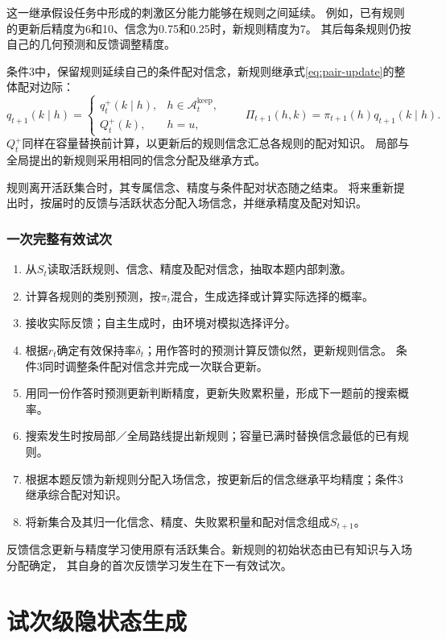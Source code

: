 \documentclass[11pt,a4paper]{article}
\numberwithin{equation}{section}
\newcommand{\A}{\mathcal{A}}
\begin{document}
这一继承假设任务中形成的刺激区分能力能够在规则之间延续。
例如，已有规则的更新后精度为6和10、信念为0.75和0.25时，新规则精度为7。
其后每条规则仍按自己的几何预测和反馈调整精度。

条件3中，保留规则延续自己的条件配对信念，新规则继承式\eqref{eq:pair-update}的整体配对边际：
\begin{equation}
q_{t+1}(k\mid h)=\begin{cases}q_t^+(k\mid h),&h\in\A_t^{\mathrm{keep}},\\
Q_t^+(k),&h=u,\end{cases}\qquad
\Pi_{t+1}(h,k)=\pi_{t+1}(h)q_{t+1}(k\mid h).
\label{eq:pair-transfer}
\end{equation}
$Q_t^+$同样在容量替换前计算，以更新后的规则信念汇总各规则的配对知识。
局部与全局提出的新规则采用相同的信念分配及继承方式。

规则离开活跃集合时，其专属信念、精度与条件配对状态随之结束。
将来重新提出时，按届时的反馈与活跃状态分配入场信念，并继承精度及配对知识。

\subsubsection{一次完整有效试次}
\begin{enumerate}
\item 从$S_t$读取活跃规则、信念、精度及配对信念，抽取本题内部刺激。
\item 计算各规则的类别预测，按$\pi_t$混合，生成选择或计算实际选择的概率。
\item 接收实际反馈；自主生成时，由环境对模拟选择评分。
\item 根据$r_t$确定有效保持率$\delta_t$；用作答时的预测计算反馈似然，更新规则信念。
条件3同时调整条件配对信念并完成一次联合更新。
\item 用同一份作答时预测更新判断精度，更新失败累积量，形成下一题前的搜索概率。
\item 搜索发生时按局部／全局路线提出新规则；容量已满时替换信念最低的已有规则。
\item 根据本题反馈为新规则分配入场信念，按更新后的信念继承平均精度；条件3继承综合配对知识。
\item 将新集合及其归一化信念、精度、失败累积量和配对信念组成$S_{t+1}$。
\end{enumerate}
反馈信念更新与精度学习使用原有活跃集合。新规则的初始状态由已有知识与入场分配确定，
其自身的首次反馈学习发生在下一有效试次。

\section{试次级隐状态生成}
\label{sec:kernel}
\end{document}
